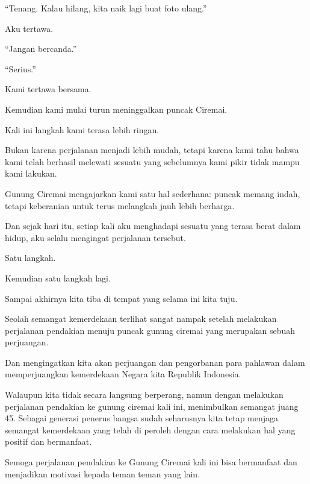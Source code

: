 “Tenang. Kalau hilang, kita naik lagi buat foto ulang.”


Aku tertawa.


“Jangan bercanda.”


“Serius.”


Kami tertawa bersama.


Kemudian kami mulai turun meninggalkan puncak Ciremai.


Kali ini langkah kami terasa lebih ringan.


Bukan karena perjalanan menjadi lebih mudah, tetapi karena kami tahu bahwa kami telah berhasil melewati sesuatu yang sebelumnya kami pikir tidak mampu kami lakukan.


Gunung Ciremai mengajarkan kami satu hal sederhana: puncak memang indah, tetapi keberanian untuk terus melangkah jauh lebih berharga.


Dan sejak hari itu, setiap kali aku menghadapi sesuatu yang terasa berat dalam hidup, aku selalu mengingat perjalanan tersebut.


Satu langkah.


Kemudian satu langkah lagi.


Sampai akhirnya kita tiba di tempat yang selama ini kita tuju.


Seolah semangat kemerdekaan terlihat sangat nampak setelah melakukan perjalanan pendakian menuju puncak gunung ciremai yang merupakan sebuah perjuangan.


Dan mengingatkan kita akan perjuangan dan pengorbanan para pahlawan dalam memperjuangkan kemerdekaan Negara kita Republik Indonesia.


Walaupun kita tidak secara langsung berperang, namun dengan melakukan perjalanan pendakian ke gunung ciremai kali ini, menimbulkan semangat juang 45. Sebagai generasi penerus bangsa sudah seharusnya kita tetap menjaga semangat kemerdekaan yang telah di peroleh dengan cara melakukan hal yang positif dan bermanfaat.


Semoga perjalanan pendakian ke Gunung Ciremai kali ini bisa bermanfaat dan menjadikan motivasi kepada teman teman yang lain. 

\jedahias
